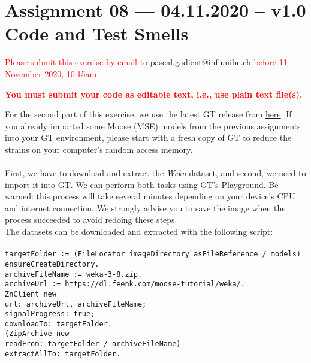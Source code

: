 \documentclass [11pt, a4wide, twoside]{article}
\begin{document}
\section*{Assignment 08 --- 04.11.2020 -- v1.0\\Code and Test Smells}

\textcolor{red}{Please submit this exercise by email to \href{mailto:pascal.gadient@inf.unibe.ch}{pascal.gadient@inf.unibe.ch} \underline{before} 11 November 2020, 10:15am.\begin{center}\textbf{You must submit your code as editable text, i.e., use plain text file(s).}\end{center}}

\noindent For the second part of this exercise, we use the latest GT release from \href{https://gtoolkit.com/download/}{here}. If you already imported some Moose (MSE) models from the previous assignments into your GT environment, please start with a fresh copy of GT to reduce the strains on your computer's random access memory.
\\\\
\noindent First, we have to download and extract the \emph{Weka} dataset, and second, we need to import it into GT. We can perform both tasks using GT's Playground. Be warned: this process will take several minutes depending on your device's CPU and internet connection. We strongly advise you to save the image when the process succeeded to avoid redoing these steps.\\

\noindent The datasets can be downloaded and extracted with the following script:\\\\
\texttt{targetFolder := (FileLocator imageDirectory asFileReference / \textquotesingle models\textquotesingle) ensureCreateDirectory.\\
archiveFileName := \textquotesingle weka-3-8.zip\textquotesingle.\\
archiveUrl := \textquotesingle https://dl.feenk.com/moose-tutorial/weka/\textquotesingle.\\
ZnClient new\\
\hspace*{0.5cm}url: archiveUrl, archiveFileName;\\
\hspace*{0.5cm}signalProgress: true;\\
\hspace*{0.5cm}downloadTo: targetFolder.\\
(ZipArchive new\\
\hspace*{0.5cm}readFrom: targetFolder / archiveFileName)\\
\hspace*{0.5cm}extractAllTo: targetFolder.}\\
\end{document}
